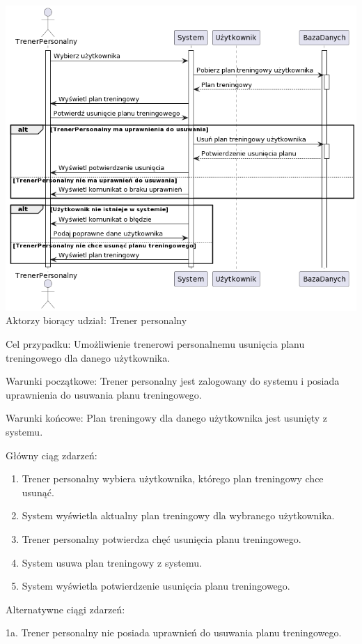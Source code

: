 \documentclass[
]{article}
\providecommand{\tightlist}{%
  \setlength{\itemsep}{0pt}\setlength{\parskip}{0pt}}
\begin{document}
{\includegraphics{diagrams/sequence/usun_plan_treningowy.png}}
{Aktorzy biorący udział: Trener personalny}

{Cel przypadku: Umożliwienie trenerowi personalnemu usunięcia planu
treningowego dla danego użytkownika.}

{Warunki początkowe: Trener personalny jest zalogowany do systemu i
posiada uprawnienia do usuwania planu treningowego.}

{Warunki końcowe: Plan treningowy dla danego użytkownika jest usunięty z
systemu.}

{Główny ciąg zdarzeń:}

\begin{enumerate}
\tightlist
\item
  {Trener personalny wybiera użytkownika, którego plan treningowy chce
  usunąć.}
\item
  {System wyświetla aktualny plan treningowy dla wybranego użytkownika.}
\item
  {Trener personalny potwierdza chęć usunięcia planu treningowego.}
\item
  {System usuwa plan treningowy z systemu.}
\item
  {System wyświetla potwierdzenie usunięcia planu treningowego.}
\end{enumerate}

{Alternatywne ciągi zdarzeń:}

{1a. Trener personalny nie posiada uprawnień do usuwania planu
treningowego.}
\end{document}
